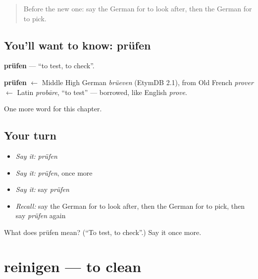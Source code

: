 \label{lesson:GE-C184-pruefen}



\begin{quote}
Before the new one: say the German for to look after, then the German for to pick.
\end{quote}

\subsection*{You'll want to know: prüfen}
\textbf{prüfen} — \textquotedblleft{}to test, to check\textquotedblright{}.

\begin{cousinweb}
\textbf{prüfen} $\leftarrow$ Middle High German \emph{brüeven} (EtymDB 2.1), from Old French \emph{prover} $\leftarrow$ Latin \emph{probāre}, \textquotedblleft{}to test\textquotedblright{} — borrowed, like English \emph{prove}.
\end{cousinweb}

\begin{grammarlens}[title={What you've built}]
One more word for this chapter.
\end{grammarlens}

\subsection*{Your turn}
\begin{itemize}
\raggedright
  \item \emph{Say it:} \emph{prüfen}
  \item \emph{Say it:} \emph{prüfen}, once more
  \item \emph{Say it:} say \emph{prüfen}
  \item \emph{Recall:} say the German for to look after, then the German for to pick, then say \emph{prüfen} again
\end{itemize}

\begin{tcolorbox}[breakable,colback=teal!4,colframe=teal!35!black,title={Before you move on}]
What does prüfen mean? (\textquotedblleft{}To test, to check\textquotedblright{}.) Say it once more.
\end{tcolorbox}
\section[reinigen]{reinigen — to clean}

\label{lesson:GE-C184-reinigen}



